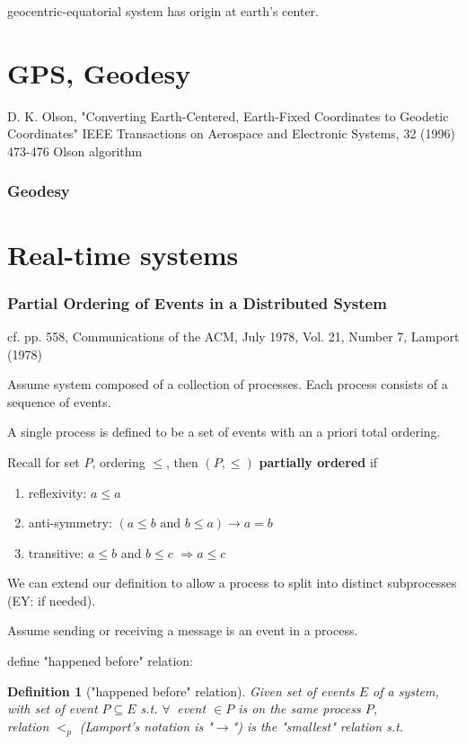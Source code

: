 \documentclass[10pt]{amsart}
\newtheorem{definition}{Definition}
\begin{document}
\begin{multicols*}{2}
geocentric-equatorial system has origin at earth's center.






\part{GPS, Geodesy} 

D. K. Olson, "Converting Earth-Centered, Earth-Fixed Coordinates to Geodetic Coordinates" IEEE Transactions on Aerospace and Electronic Systems, 32 (1996) 473-476 Olson algorithm

\section{Geodesy}

\part{Real-time systems}

\section{Partial Ordering of Events in a Distributed System}

cf. pp. 558, Communications of the ACM, July 1978, Vol. 21, Number 7, Lamport (1978) \cite{Lamp1978}

Assume system composed of a collection of processes. Each process consists of a sequence of events.

A single process is defined to be a set of events with an a priori total ordering.

Recall for set $P$, ordering $\leq$, then $(P, \leq)$ \textbf{partially ordered} if 
\begin{enumerate}
	\item reflexivity: $a \leq a$
	\item anti-symmetry: $(a\leq b \text{ and } b\leq a) \to a = b$
	\item transitive: $a\leq b$ and $b\leq c$ $\Longrightarrow a \leq c$
\end{enumerate}

We can extend our definition to allow a process to split into distinct subprocesses (EY: if needed).

Assume sending or receiving a message is an event in a process.

define "happened before" relation:

\begin{definition}["happened before" relation]\label{Def:HappenedBeforePartialOrdering}
	Given set of events $E$ of a system, with set of event $P\subseteq E$ s.t. $\forall \, $ event $\in P$ is on the same process $P$, \\
	relation $ <_p$ (Lamport's notation is "$\to$") is the "smallest" relation s.t.
	

\end{definition}
\end{multicols*}
\end{document}
